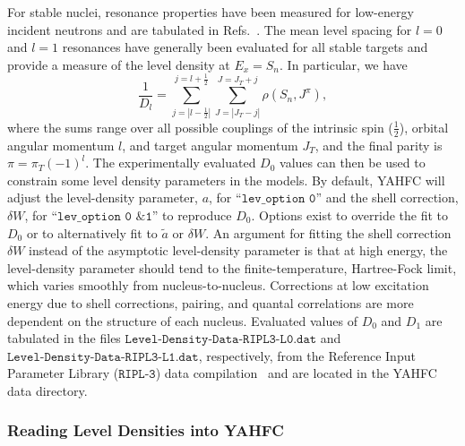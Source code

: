 \documentclass[
10pt,
showpacs,preprintnumbers,footinbib,
amsfonts,amsmath,amssymb,
aps,
prc,twocolumn,groupedaddress,superscriptaddress,
showkeys,
nofootinbib
]{revtex4-1}
\begin{document}
For stable nuclei, resonance properties have been measured for low-energy incident neutrons and are tabulated in Refs.~\cite{Mughabghab-1:2018,Mughabghab-2:2018}. The mean level spacing for $l=0$ and $l=1$ resonances have generally been evaluated for all stable targets and provide a measure of the level density at $E_x=S_n$. In particular, we have
\begin{equation}
\frac{1}{D_l} = \sum_{j=|l-\frac{1}{2}|}^{j=l+\frac{1}{2}}\sum_{J=|J_T-j|}^{J=J_T+j} \rho(S_n,J^\pi),
\end{equation}
where the sums range over all possible couplings of the intrinsic spin ($\frac{1}{2}$), orbital angular momentum $l$, and target angular momentum $J_T$, and the final parity is $\pi = \pi_T(-1)^l$. The experimentally evaluated $D_0$ values can then be used to constrain some level density parameters in the models. 
By default, YAHFC will adjust the level-density parameter,
$a$, for ``${\texttt{lev\_option 0}}$'' and the shell correction, $\delta W$,
for ``${\texttt{lev\_option 0 \& 1}}$'' to reproduce $D_0$. Options exist
to override the fit to $D_0$ or to alternatively fit to $\tilde a$ or $\delta W$.  An argument for fitting the shell correction $\delta W$ instead of the asymptotic level-density parameter is that at high energy, the level-density parameter should tend to the finite-temperature, Hartree-Fock limit, which varies smoothly from nucleus-to-nucleus. Corrections at low excitation energy due to shell corrections, pairing, and quantal correlations are more dependent on the structure of each nucleus. Evaluated values of $D_0$ and $D_1$ are tabulated in the files ${\texttt{Level-Density-Data-RIPL3-L0.dat}}$ and ${\texttt{Level-Density-Data-RIPL3-L1.dat}}$, respectively, from the Reference Input Parameter Library (${\texttt{RIPL-3}}$) data compilation~\cite{Capote:2009,RIPL-3} and are located in the YAHFC data directory.

\subsubsection{Reading Level Densities into YAHFC}
\end{document}
